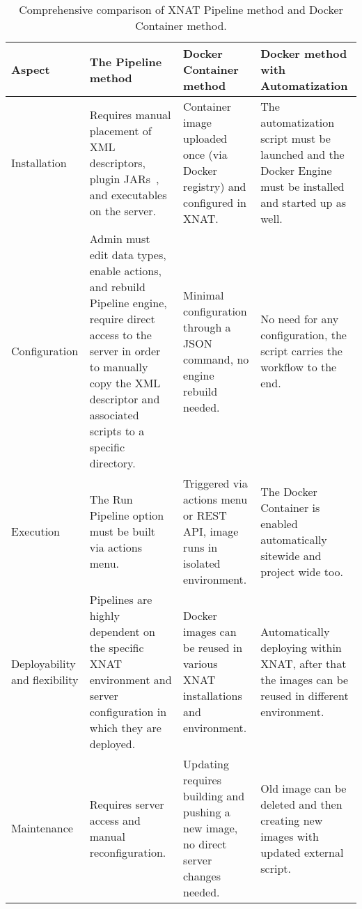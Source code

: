 \begin{table}[htbp]
  \centering
  \caption{Comprehensive comparison of XNAT Pipeline method and Docker Container method.}
  \label{tab:pipeline-vs-docker}

  \begin{tabular}{|>{\centering\arraybackslash}p{2cm}|
                      >{\centering\arraybackslash}p{4cm}|
                      >{\centering\arraybackslash}p{4cm}|
                      >{\centering\arraybackslash}p{4cm}|}
    \hline
    \textbf{Aspect} & \textbf{The Pipeline method} & \textbf{Docker Container method} & \textbf{Docker method with Automatization }\\ \hline
    
    
    Installation & Requires manual placement of XML descriptors, plugin JARs~\cite{installpipeline}, and executables on the server. & Container image uploaded once (via Docker registry) and configured in XNAT. & The automatization script must be launched and the Docker Engine must be installed and started up as well. \\ \hline
    

    
    Configuration & Admin must edit data types, enable actions, and rebuild Pipeline engine, require direct access to the server in order to manually copy the XML descriptor and associated scripts to a specific directory. & Minimal configuration through a JSON command, no engine rebuild needed. & No need for any configuration, the script carries the workflow to the end. \\ \hline
    
    Execution & The Run Pipeline option must be built via actions menu. & Triggered via actions menu or REST API, image runs in isolated environment. & The Docker Container is enabled automatically sitewide and project wide too. \\ \hline

    Deployability and flexibility & Pipelines are highly dependent on the specific XNAT environment and server configuration in which they are deployed. & Docker images can be reused in various XNAT installations and environment. & Automatically deploying within XNAT, after that the images can be reused in different environment. \\ \hline
    
    Maintenance & Requires server access and manual reconfiguration. & Updating requires building and pushing a new image, no direct server changes needed. & Old image can be deleted and then creating new images with updated external script.\\ \hline
    

\end{tabular}
\end{table}
